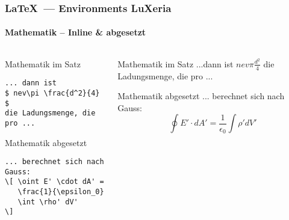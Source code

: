 \begin{frame}[fragile]
    \frametitle{\LaTeX~--- Environments \hfill{} LuXeria}
    \framesubtitle{Mathematik -- Inline \& abgesetzt}
    \begin{columns}
        \begin{column}{5cm}
            \begin{block}{Mathematik im Satz}
\begin{lstlisting}
... dann ist
$ nev\pi \frac{d^2}{4} $ 
die Ladungsmenge, die pro ...
\end{lstlisting}
            \end{block}
            \begin{block}{Mathematik abgesetzt}
\begin{lstlisting}
... berechnet sich nach Gauss: 
\[ \oint E' \cdot dA' = 
   \frac{1}{\epsilon_0} 
   \int \rho' dV' 
\]
\end{lstlisting}
            \end{block}
        \end{column}
        \begin{column}{5cm}
            \begin{block}{Mathematik im Satz}
            ...dann ist $nev\pi \frac{d^2}{4}$ die Ladungsmenge,
            die pro ...%
            \end{block}
            \begin{block}{Mathematik abgesetzt}
            ... berechnet sich nach Gauss:
            \[ \oint E' \cdot dA' = \frac{1}{\epsilon_0} \int \rho' dV' \]
            \end{block}
        \end{column}
    \end{columns}
\end{frame}

